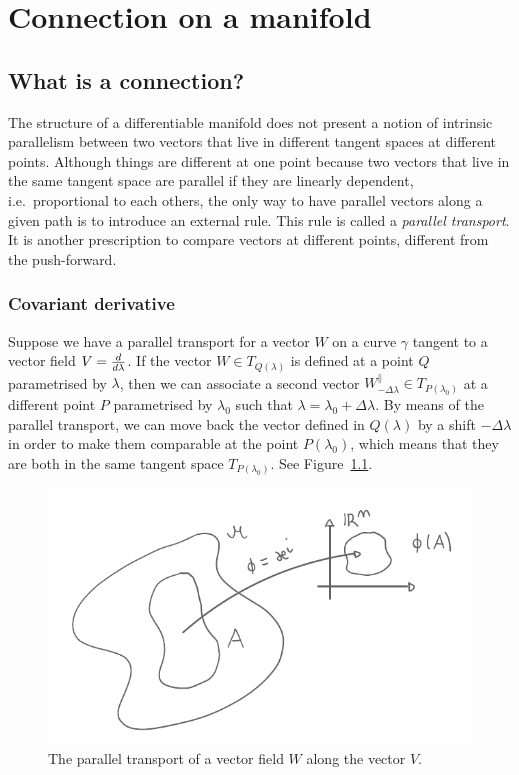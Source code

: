 \part{Connection on a manifold}

\chapter{What is a connection?}

    The structure of a differentiable manifold does not present a notion of intrinsic parallelism between two vectors that live in different tangent spaces at different points. Although things are different at one point because two vectors that live in the same tangent space are parallel if they are linearly dependent, i.e.~proportional to each others, the only way to have parallel vectors along a given path is to introduce an external rule. This rule is called a \textit{parallel transport}. It is another prescription to compare vectors at different points, different from the push-forward.
    
\section{Covariant derivative}

    Suppose we have a parallel transport for a vector $W$ on a curve $\gamma$ tangent to a vector field $V = \frac{d}{d\lambda}$. If the vector $W \in T_{Q(\lambda)}$ is defined at a point $Q$ parametrised by $\lambda$, then we can associate a second vector $W^\parallel_{-\Delta \lambda} \in T_{P(\lambda_0)}$ at a different point $P$ parametrised by $\lambda_0$ such that $\lambda = \lambda_0 + \Delta \lambda$. By means of the parallel transport, we can move back the vector defined in $Q(\lambda)$ by a shift $-\Delta \lambda$ in order to make them comparable at the point $P(\lambda_0)$, which means that they are both in the same tangent space $T_{P(\lambda_0)}$. See Figure~\ref{fig:covder}.

    \begin{figure}[h!]
        \centering
        \includegraphics{chart.pdf}
        \caption{The parallel transport of a vector field $W$ along the vector $V$.}\label{fig:covder}
    \end{figure}

